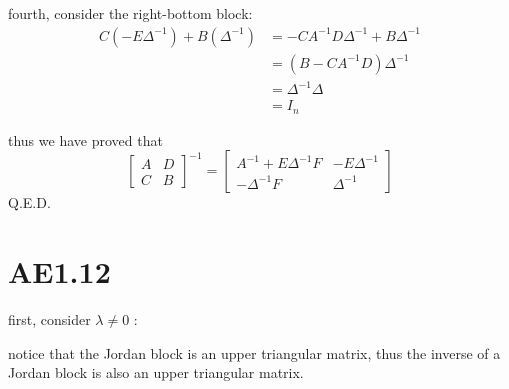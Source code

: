 \documentclass[12pt,a4paper]{article}
\begin{document}
fourth, consider the right-bottom block:
\[
    \begin{aligned}
        C(-E\Delta^{-1}) + B(\Delta^{-1}) & = -CA^{-1}D\Delta^{-1} + B\Delta^{-1} \\
                                          & = (B - CA^{-1}D)\Delta^{-1} \\
                                          & = \Delta^{-1}\Delta \\
                                        & = I_n
    \end{aligned}
\]

thus we have proved that
\[
    \begin{bmatrix}
        A & D \\
        C & B
    \end{bmatrix}^{-1} = \begin{bmatrix}
        A^{-1}+E\Delta^{-1}F & -E\Delta^{-1} \\
        -\Delta^{-1}F & \Delta^{-1}
    \end{bmatrix}
\]
Q.E.D.

\section{AE1.12}
first, consider $\lambda \neq 0$ :

notice that the Jordan block is an upper triangular matrix, 
thus the inverse of a Jordan block is also an upper triangular matrix.
\end{document}
